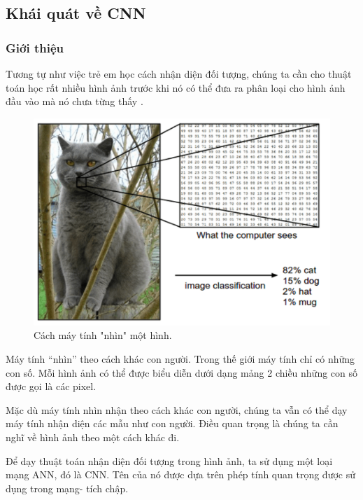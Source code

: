 \setcounter{chapter}{0}
\setcounter{section}{0}
\begin{center}
\chapter{\tenchuongi}
\end{center}

\section{Khái quát về CNN}
\subsection{Giới thiệu}
Tương tự như việc trẻ em học cách nhận diện đối tượng, chúng ta cần cho thuật toán học rất nhiều hình ảnh trước khi nó có thể đưa ra phân loại cho hình ảnh đầu vào mà nó chưa từng thấy \cite{ntt8b3}.

\begin{figure}[H]
	\centering
	\includegraphics[width=0.7\linewidth]{images/how_computer_see_image}
	\caption[Cách máy tính "nhìn" một hình.]{Cách máy tính "nhìn" một hình.}
\end{figure}

Máy tính “nhìn” theo cách khác con người. Trong thế giới máy tính chỉ có những con số. Mỗi hình ảnh có thể được biểu diễn dưới dạng mảng 2 chiều những con số được gọi là các pixel.

Mặc dù máy tính nhìn nhận theo cách khác con người, chúng ta vẫn có thể dạy máy tính nhận diện các mẫu như con người. Điều quan trọng là chúng ta cần nghĩ về hình ảnh theo một cách khác đi.

Để dạy thuật toán nhận diện đối tượng trong hình ảnh, ta sử dụng một loại mạng ANN, đó là CNN. Tên của nó được dựa trên phép tính quan trọng được sử dụng trong mạng- tích chập.


